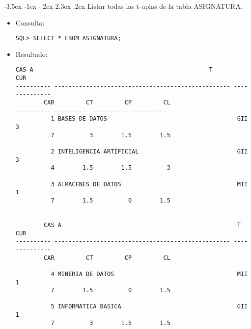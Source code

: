 \documentclass[11pt]{report}
\makeatletter
\renewcommand\chapter{\@startsection{chapter}{0}{\z@}%
    {-3.5ex \@plus -1ex \@minus -.2ex}%
    {2.3ex \@plus.2ex}%
    {\normalfont\Large\bfseries}}
\makeatother
\begin{document}
\chapter{Listar todas las t-uplas de la tabla ASIGNATURA. }
\begin{itemize}
  \item Consulta:
  \begin{verbatim}
SQL> SELECT * FROM ASIGNATURA;
  \end{verbatim}
  \item{Resultado:}
  \begin{verbatim}
CAS A                                                  T           CUR   
---------- -------------------------------------------------- ---- ----------   
        CAR         CT         CP         CL                                     
---------- ---------- ---------- ----------                                     
          1 BASES DE DATOS                                     GII           3   
          7          3        1.5        1.5                                     
                                                                                
          2 INTELIGENCIA ARTIFICIAL                            GII           3   
          4        1.5        1.5          3                                     
                                                                                
          3 ALMACENES DE DATOS                                 MII           1   
          7        1.5          0        1.5                                     
                                                                                

        CAS A                                                  T           CUR   
---------- -------------------------------------------------- ---- ----------   
        CAR         CT         CP         CL                                     
---------- ---------- ---------- ----------                                     
          4 MINERIA DE DATOS                                   MII           1   
          7        1.5          0        1.5                                     
                                                                                
          5 INFORMATICA BASICA                                 GII           1   
          7          3        1.5        1.5                                     
                                                                                

\end{verbatim}
\end{itemize}
\end{document}
